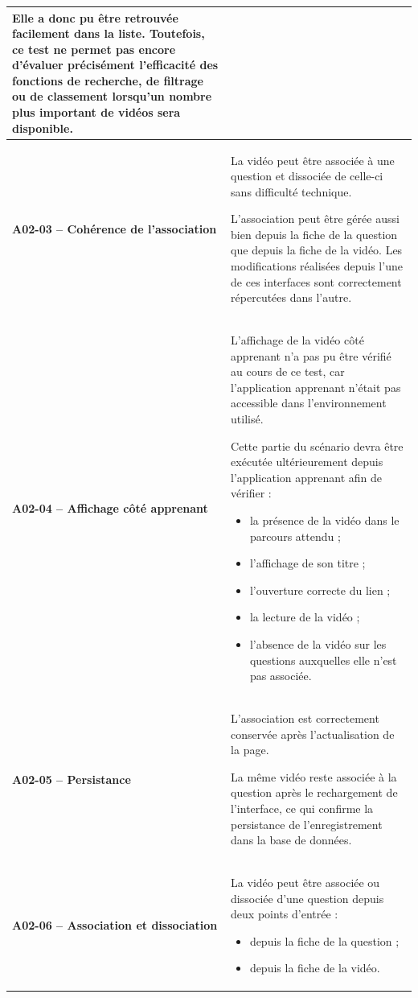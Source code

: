 \begin{longtable}{
    |>{\raggedright\arraybackslash}p{}
    |>{\raggedright\arraybackslash}p{}|
}
Elle a donc pu être retrouvée facilement dans la liste. Toutefois, ce test
ne permet pas encore d'évaluer précisément l'efficacité des fonctions de
recherche, de filtrage ou de classement lorsqu'un nombre plus important de
vidéos sera disponible.
\\
\hline

\textbf{A02-03 -- Cohérence de l'association}
&
La vidéo peut être associée à une question et dissociée de celle-ci sans
difficulté technique.

L'association peut être gérée aussi bien depuis la fiche de la question que
depuis la fiche de la vidéo. Les modifications réalisées depuis l'une de
ces interfaces sont correctement répercutées dans l'autre.
\\
\hline

\textbf{A02-04 -- Affichage côté apprenant}
&
L'affichage de la vidéo côté apprenant n'a pas pu être vérifié au cours de
ce test, car l'application apprenant n'était pas accessible dans
l'environnement utilisé.

Cette partie du scénario devra être exécutée ultérieurement depuis
l'application apprenant afin de vérifier :
\begin{itemize}[leftmargin=*,nosep]
    \item la présence de la vidéo dans le parcours attendu ;
    \item l'affichage de son titre ;
    \item l'ouverture correcte du lien ;
    \item la lecture de la vidéo ;
    \item l'absence de la vidéo sur les questions auxquelles elle n'est pas
    associée.
\end{itemize}
\\
\hline

\textbf{A02-05 -- Persistance}
&
L'association est correctement conservée après l'actualisation de la page.

La même vidéo reste associée à la question après le rechargement de
l'interface, ce qui confirme la persistance de l'enregistrement dans la
base de données.
\\
\hline

\textbf{A02-06 -- Association et dissociation}
&
La vidéo peut être associée ou dissociée d'une question depuis deux points
d'entrée :
\begin{itemize}[leftmargin=*,nosep]
    \item depuis la fiche de la question ;
    \item depuis la fiche de la vidéo.
\end{itemize}


\end{longtable}
